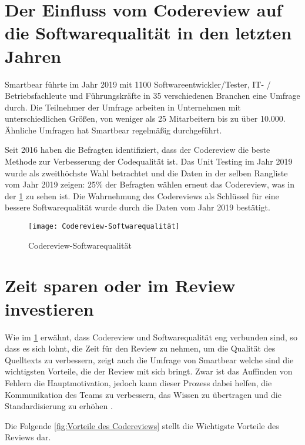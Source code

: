 \section{Der Einfluss vom Codereview auf die Softwarequalität in den letzten Jahren}
\label{sec:Einfluss des Reviews}
Smartbear \cite{smartbear} führte im Jahr 2019 mit 1100 Softwareentwickler/Tester, IT- / Betriebsfachleute und Führungskräfte in 35 verschiedenen Branchen eine Umfrage durch. Die Teilnehmer der Umfrage arbeiten in Unternehmen mit unterschiedlichen Größen, von weniger als 25 Mitarbeitern bis zu über 10.000. Ähnliche Umfragen hat Smartbear regelmäßig durchgeführt.

Seit 2016 haben die Befragten identifiziert, dass der Codereview die beste Methode zur Verbesserung der Codequalität ist. Das Unit Testing im Jahr 2019 wurde als zweithöchste Wahl betrachtet und die Daten in der selben Rangliste vom Jahr 2019 zeigen: 25\% der Befragten wählen erneut das Codereview, was in der \cref{fig:Codereview-Softwarequalität} zu sehen ist. Die Wahrnehmung des Codereviews als Schlüssel für eine bessere Softwarequalität wurde durch die Daten vom Jahr 2019 bestätigt.

\begin{figure}[H]
	\centering
	\texttt{[image: Codereview-Softwarequalität]}
	\caption[Einfluss der Codereview auf die Softwarequalität]{Codereview-Softwarequalität\\ \cite{smartbear}}
	\label{fig:Codereview-Softwarequalität}
\end{figure}

\section{Zeit sparen oder im Review investieren}
\label{sec:reviewZeit}

Wie im \cref{sec:Einfluss des Reviews} erwähnt, dass Codereview und Softwarequalität eng verbunden sind, so dass es sich lohnt, die Zeit für den Review zu nehmen, um die Qualität des Quelltexts zu verbessern, zeigt auch die Umfrage von Smartbear welche sind die wichtigsten Vorteile, die der Review mit sich bringt. Zwar ist das Auffinden von Fehlern die Hauptmotivation, jedoch kann dieser Prozess dabei helfen, die Kommunikation des Teams zu verbessern, das Wissen zu übertragen und die Standardisierung zu erhöhen \cite{smartbear}. 

Die Folgende \cref{fig:Vorteile des Codereviews} stellt die Wichtigste Vorteile des Reviews dar.

